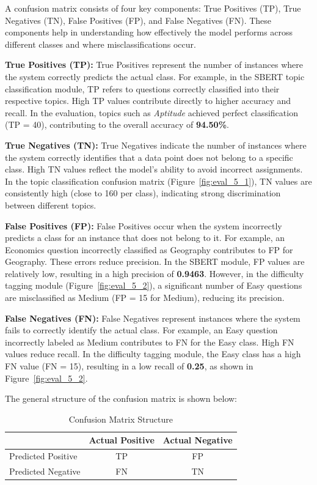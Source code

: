 \begin{sloppypar}
A confusion matrix consists of four key components: True Positives (TP), True Negatives (TN), False Positives (FP), and False Negatives (FN). These components help in understanding how effectively the model performs across different classes and where misclassifications occur.

\textbf{True Positives (TP):} True Positives represent the number of instances where the system correctly predicts the actual class. For example, in the SBERT topic classification module, TP refers to questions correctly classified into their respective topics. High TP values contribute directly to higher accuracy and recall. In the evaluation, topics such as \textit{Aptitude} achieved perfect classification (TP = 40), contributing to the overall accuracy of \textbf{94.50\%}.

\textbf{True Negatives (TN):} True Negatives indicate the number of instances where the system correctly identifies that a data point does not belong to a specific class. High TN values reflect the model's ability to avoid incorrect assignments. In the topic classification confusion matrix (Figure~\ref{fig:eval_5_1}), TN values are consistently high (close to 160 per class), indicating strong discrimination between different topics.

\textbf{False Positives (FP):} False Positives occur when the system incorrectly predicts a class for an instance that does not belong to it. For example, an Economics question incorrectly classified as Geography contributes to FP for Geography. These errors reduce precision. In the SBERT module, FP values are relatively low, resulting in a high precision of \textbf{0.9463}. However, in the difficulty tagging module (Figure~\ref{fig:eval_5_2}), a significant number of Easy questions are misclassified as Medium (FP = 15 for Medium), reducing its precision.

\textbf{False Negatives (FN):} False Negatives represent instances where the system fails to correctly identify the actual class. For example, an Easy question incorrectly labeled as Medium contributes to FN for the Easy class. High FN values reduce recall. In the difficulty tagging module, the Easy class has a high FN value (FN = 15), resulting in a low recall of \textbf{0.25}, as shown in Figure~\ref{fig:eval_5_2}.

The general structure of the confusion matrix is shown below:

\begin{table}[H]
\centering
\caption{Confusion Matrix Structure}
\label{tab:cm_structure}
\begin{tabular}{|l|c|c|}
\hline
 & Actual Positive & Actual Negative \\
\hline
Predicted Positive & TP & FP \\
\hline
Predicted Negative & FN & TN \\
\hline
\end{tabular}
\end{table}


\end{sloppypar}
